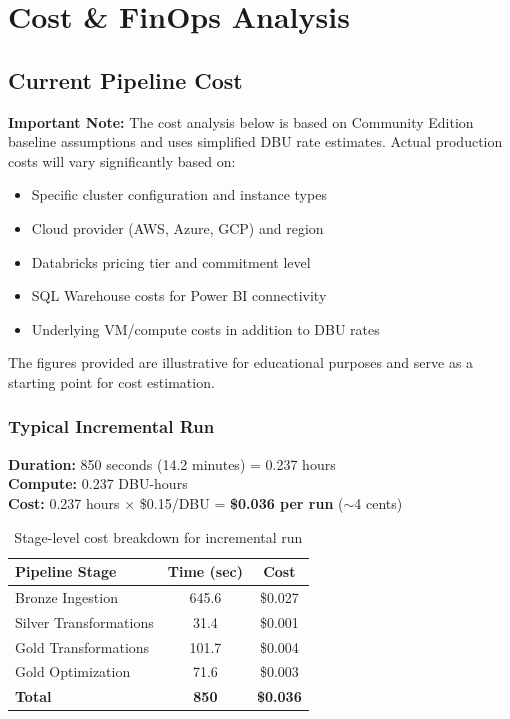 \documentclass[11pt,a4paper]{article}
\begin{document}
\newpage

\section{Cost \& FinOps Analysis}

\subsection{Current Pipeline Cost}

\textbf{Important Note:} The cost analysis below is based on Community Edition baseline assumptions and uses simplified DBU rate estimates. Actual production costs will vary significantly based on:
\begin{itemize}[nosep]
    \item Specific cluster configuration and instance types
    \item Cloud provider (AWS, Azure, GCP) and region
    \item Databricks pricing tier and commitment level
    \item SQL Warehouse costs for Power BI connectivity
    \item Underlying VM/compute costs in addition to DBU rates
\end{itemize}

The figures provided are illustrative for educational purposes and serve as a starting point for cost estimation.

\subsubsection{Typical Incremental Run}

\textbf{Duration:} 850 seconds (14.2 minutes) = 0.237 hours \\
\textbf{Compute:} 0.237 DBU-hours \\
\textbf{Cost:} 0.237 hours $\times$ \$0.15/DBU = \textbf{\$0.036 per run} ($\sim$4 cents)

\vspace{0.3cm}

\begin{table}[h]
\centering
\begin{tabular}{@{}lcc@{}}
\toprule
\textbf{Pipeline Stage} & \textbf{Time (sec)} & \textbf{Cost} \\
\midrule
Bronze Ingestion & 645.6 & \$0.027 \\
Silver Transformations & 31.4 & \$0.001 \\
Gold Transformations & 101.7 & \$0.004 \\
Gold Optimization & 71.6 & \$0.003 \\
\midrule
\textbf{Total} & \textbf{850} & \textbf{\$0.036} \\
\bottomrule
\end{tabular}
\caption{Stage-level cost breakdown for incremental run}
\end{table}
\end{document}
